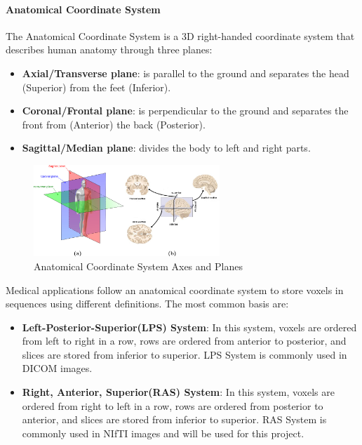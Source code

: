 \documentclass[12pt]{article}
\begin{document}
\paragraph*{Anatomical Coordinate System}
The Anatomical Coordinate System is a 3D right-handed coordinate system that describes human anatomy through three planes:\cite{SlicerWikiCoordinateSystems} \cite{Nejad2017}
\begin{itemize}
  \item \textbf{Axial/Transverse plane}: is parallel to the ground and separates the head (Superior) from the feet (Inferior).
  \item \textbf{Coronal/Frontal plane}: is perpendicular to the ground and separates the front from (Anterior) the back (Posterior).
  \item \textbf{Sagittal/Median plane}: divides the body to left and right parts.
\end{itemize}
\begin{figure}[hbpt!]
  \centering
  \includegraphics[width=70mm]{anatomical-coordinate-sytem-fmri.png}
  \caption{Anatomical Coordinate System Axes and Planes~\cite{Asaei2015BrainML}}
  \label{anatomicalcoordfMRI}
\end{figure}

Medical applications follow an anatomical coordinate system to store voxels in sequences using different definitions. The most common basis are:
\begin{itemize}
  \item  \textbf{Left-Posterior-Superior(LPS) System}: In this system, voxels are ordered
        from left to right in a row, rows are ordered from anterior to posterior, and slices are
        stored from inferior to superior. LPS System is commonly used in DICOM images.
  \item  \textbf{Right, Anterior, Superior(RAS) System}: In this system, voxels are ordered
        from right to left in a row, rows are ordered from posterior to anterior, and slices are
        stored from inferior to superior. RAS System is commonly used in NIfTI images and will be used for this project.
\end{itemize}
\end{document}
